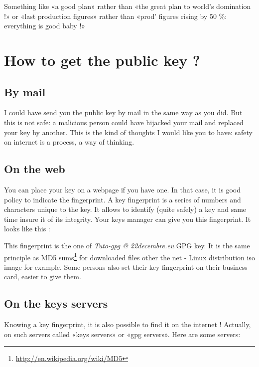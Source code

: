 Something like «a good plan» rather than «the great plan to world's domination !» or «last production figures» rather than «prod' figures
rising by 50 \%: everything is good baby !»

\section{How to get the public key ?}\label{how-to-get-the-public-key}

\subsection{By mail}\label{by-mail}

I could have send you the public key by mail in the same way as you did. But this is not safe: a malicious person could have hijacked your mail and replaced your key by another. This is the kind of thoughts I would like you to have: safety on internet is a process, a way of thinking.

\subsection{On the web}\label{on-the-web}

You can place your key on a webpage if you have one. In that case, it is good policy to indicate the fingerprint. A key fingerprint is a series of numbers and characters unique to the key. It allows to identify (quite safely) a key and same time insure it of its integrity. Your keys manager can give you this fingerprint. It looks like this :

\begin{center}
\end{center}

This fingerprint is the one of \emph{Tuto-gpg @ 22decembre.eu} GPG key. It is the same principle as MD5 sums\footnote{\url{http://en.wikipedia.org/wiki/MD5}} for downloaded files other the net - Linux distribution iso image for example. Some persons also set their key fingerprint on their business card, easier to give them.

\subsection{On the keys servers}\label{on-the-keys-servers}

Knowing a key fingerprint, it is also possible to find it on the
internet ! Actually, on such servers called «keys servers» or «gpg
servers». Here are some servers:

